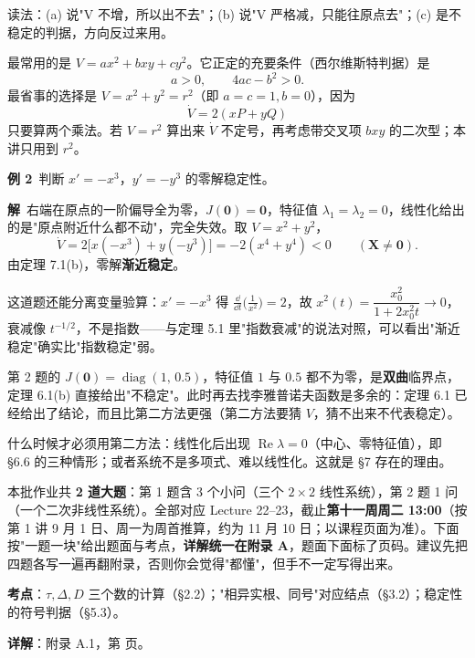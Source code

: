 \documentclass[11pt]{ctexart}
\renewcommand{\qbreak}{\needspace{0.26\textheight}}
\newcommand{\X}{\mathbf{X}}\newcommand{\Y}{\mathbf{Y}}
\newcommand{\Jac}{J}
\begin{document}
读法：(a) 说"V 不增，所以出不去"；(b) 说"V 严格减，只能往原点去"；(c) 是不稳定的判据，方向反过来用。


最常用的是 $V=ax^{2}+bxy+cy^{2}$。它正定的充要条件（西尔维斯特判据）是
\[
a>0,\qquad 4ac-b^{2}>0 .
\tag{7.1}
\]
最省事的选择是 $V=x^{2}+y^{2}=r^{2}$（即 $a=c=1,b=0$），因为
\[
\dot V=2(xP+yQ)
\]
只要算两个乘法。若 $V=r^{2}$ 算出来 $\dot V$ 不定号，再考虑带交叉项 $bxy$ 的二次型；本讲只用到 $r^{2}$。


\textbf{例 2}\ 判断 $x'=-x^{3}$，$y'=-y^{3}$ 的零解稳定性。

\textbf{解}\ 右端在原点的一阶偏导全为零，$\Jac(\mathbf{0})=\mathbf{0}$，特征值 $\lambda_{1}=\lambda_{2}=0$，线性化给出的是"原点附近什么都不动"，完全失效。取 $V=x^{2}+y^{2}$，
\[
\dot V=2\big[x(-x^{3})+y(-y^{3})\big]=-2(x^{4}+y^{4})<0\qquad(\X\neq\mathbf{0}).
\]
由定理 7.1(b)，零解\textbf{渐近稳定}。

这道题还能分离变量验算：$x'=-x^{3}$ 得 $\frac{\dd}{\dd t}\big(\frac{1}{x^{2}}\big)=2$，故 $x^{2}(t)=\dfrac{x_0^{2}}{1+2x_0^{2}t}\to0$，衰减像 $t^{-1/2}$，不是指数——与定理 5.1 里"指数衰减"的说法对照，可以看出"渐近稳定"确实比"指数稳定"弱。


第 2 题的 $\Jac(\mathbf{0})=\operatorname{diag}(1,\,0.5)$，特征值 $1$ 与 $0.5$ 都不为零，是\textbf{双曲}临界点，定理 6.1(b) 直接给出"不稳定"。此时再去找李雅普诺夫函数是多余的：定理 6.1 已经给出了结论，而且比第二方法更强（第二方法要猜 $V$，猜不出来不代表稳定）。

什么时候才必须用第二方法：线性化后出现 $\operatorname{Re}\lambda=0$（中心、零特征值），即 §6.6 的三种情形；或者系统不是多项式、难以线性化。这就是 §7 存在的理由。

\needspace{0.32\textheight}

本批作业共 \textbf{2 道大题}：第 1 题含 3 个小问（三个 $2\times2$ 线性系统），第 2 题 1 问（一个二次非线性系统）。全部对应 Lecture 22--23，截止\textbf{第十一周周二 13:00}（按第 1 讲 9 月 1 日、周一为周首推算，约为 11 月 10 日；以课程页面为准）。下面按"一题一块"给出题面与考点，\textbf{详解统一在附录 A}，题面下面标了页码。建议先把四题各写一遍再翻附录，否则你会觉得"都懂"，但手不一定写得出来。

\qbreak
{}
\textbf{考点}：$\tau,\Delta,D$ 三个数的计算（§2.2）；"相异实根、同号"对应结点（§3.2）；稳定性的符号判据（§5.3）。
\par\textbf{详解}：附录 A.1，第 \pageref{app:a1} 页。
\end{document}
